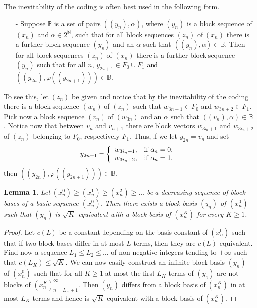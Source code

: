 \documentclass[10pt]{amsart}
\numberwithin{equation}{section}
\newtheorem{lemme}[thm]{Lemma}
\begin{document}
The inevitability of the coding is often best used in the following form.
\begin{itemize}
  \item [-] Suppose ${\mathbb B}$ is a set of pairs $((y_n),\alpha)$, where $(y_n)$ is a block
  sequence of $(x_n)$ and $\alpha\in {{2^{\mathbb N}}}$, such that for all block
  sequences $(z_n)$ of $(x_n)$ there is a further block sequence $(y_n)$
  and an $\alpha$ such that $((y_n),\alpha)\in{\mathbb B}$. Then for all block
  sequences $(z_n)$ of $(x_n)$ there is a further block sequence $(y_n)$
  such that for all $n$, $y_{2n+1}\in F_0\cup F_1$ and
  $((y_{2n}),\varphi((y_{2n+1})))\in {\mathbb B}$.
\end{itemize}
To see this, let $(z_n)$ be given and notice that by the inevitability of the
coding there is a block sequence $(w_n)$ of $(z_n)$ such that $w_{3n+1}\in F_0$
and $w_{3n+2}\in F_1$. Pick now a block sequence $(v_n)$ of $(w_{3n})$ and an
$\alpha$ such that $((v_n),\alpha)\in {\mathbb B}$. Notice now that between $v_n$ and
$v_{n+1}$ there are block vectors $w_{3i_n+1}$ and $w_{3i_n+2}$ of $(z_n)$
belonging to $F_0$, respectively $F_1$. Thus, if we let $y_{2n}=v_n$ and set
$$
y_{2n+1}=\left\{
           \begin{array}{ll}
             w_{3i_n+1}, & \hbox{if $\alpha_n=0$;} \\
             w_{3i_n+2}, & \hbox{if $\alpha_n=1$.}
           \end{array}
         \right.
$$
then $((y_{2n}),\varphi((y_{2n+1})))\in {\mathbb B}$.

\begin{lemme}\label{block uniformisation}
Let $(x_n^0){\ensuremath{\geqslant}} (x_n^1){\ensuremath{\geqslant}} (x_n^2){\ensuremath{\geqslant}} \ldots$ be a decreasing sequence of
block bases of a basic sequence $(x_n^0)$. Then there exists a block basis
$(y_n)$ of $(x_n^0)$ such that $(y_n)$ is $\sqrt K$-equivalent with a block
basis of $(x_n^K)$ for every $K{\ensuremath{\geqslant}} 1$.
\end{lemme}

\begin{proof}
Let $c(L)$ be a constant depending on the basis constant of $(x_n^0)$ such that
if two block bases differ in at most $L$ terms, then they are
$c(L)$-equivalent. Find now a sequence $L_1{\ensuremath{\leqslant}} L_2{\ensuremath{\leqslant}} \ldots$ of non-negative
integers tending to $+\infty$ such that $c(L_K){\ensuremath{\leqslant}} \sqrt K$. We can now easily
construct an infinite block basis $(y_n)$ of $(x_n^0)$ such that for all $K{\ensuremath{\geqslant}}
1$ at most the first $L_K$ terms of $(y_n)$ are not blocks of
$(x_n^K)_{n=L_K+1}^\infty$. Then $(y_n)$ differs from a block basis of
$(x_n^K)$ in at most $L_K$ terms and hence is $\sqrt K$-equivalent with a block
basis of $(x_n^K)$.
\end{proof}
\end{document}
